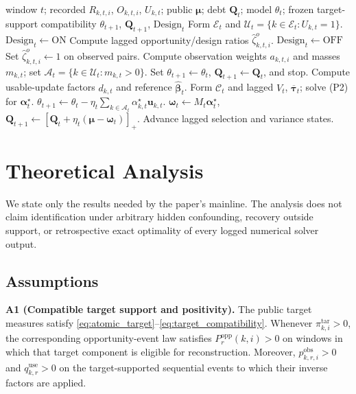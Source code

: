 \documentclass[letterpaper,journal]{IEEEtran}
\begin{document}
\begin{algorithm}[t]
\caption{Window-close RAVEN-MCS aggregation with support-conditional Design}
\label{alg:window_close}
\begin{algorithmic}[1]
\REQUIRE window $t$; recorded $R_{k,t,i}$, $O_{k,t,i}$, $U_{k,t}$;
public $\boldsymbol\mu$; debt $\mathbf{Q}_t$; model $\theta_t$;
frozen target-support compatibility
\ENSURE $\theta_{t+1}$, $\mathbf{Q}_{t+1}$, $\mathrm{Design}_t$
\STATE Form $\mathcal{E}_t$ and
$\mathcal{U}_t=\{k\in\mathcal{E}_t:U_{k,t}=1\}$.
\STATE $\mathrm{Design}_t\leftarrow\mathrm{ON}$
\STATE Compute lagged opportunity/design ratios
$\widehat\zeta^{o}_{k,t,i}$.
\ELSE
\STATE $\mathrm{Design}_t\leftarrow\mathrm{OFF}$
\STATE Set $\widehat\zeta^{o}_{k,t,i}\leftarrow 1$ on observed pairs.
\ENDIF
\STATE Compute observation weights $a_{k,t,i}$ and masses $m_{k,t}$;
set $\mathcal{A}_t=\{k\in\mathcal{U}_t:m_{k,t}>0\}$.
\STATE Set $\theta_{t+1}\leftarrow\theta_t$,
$\mathbf{Q}_{t+1}\leftarrow\mathbf{Q}_t$, and stop.
\ELSE
\STATE Compute usable-update factors $d_{k,t}$ and reference
$\widehat{\boldsymbol\beta}_t$.
\STATE Form $\mathcal{C}_t$ and lagged $V_t$,
$\overline{\boldsymbol\tau}_t$; solve (P2) for
$\boldsymbol\alpha_t^\star$.
\STATE $\theta_{t+1}\leftarrow\theta_t
-\eta_t\sum_{k\in\mathcal{A}_t}\alpha^\star_{k,t}\mathbf{u}_{k,t}$.
\STATE $\boldsymbol\omega_t\leftarrow M_t\boldsymbol\alpha_t^\star$,
$\mathbf{Q}_{t+1}\leftarrow
[\mathbf{Q}_t+\eta_t(\boldsymbol\mu-\boldsymbol\omega_t)]_+$.
\STATE Advance lagged selection and variance states.
\ENDIF
\end{algorithmic}
\end{algorithm}


\section{Theoretical Analysis}
\label{sec:theory}

We state only the results needed by the paper's mainline.  The analysis does not
claim identification under arbitrary hidden confounding, recovery outside
support, or retrospective exact optimality of every logged numerical solver
output.

\subsection{Assumptions}
\label{subsec:assumptions}

\noindent\textbf{A1 (Compatible target support and positivity).}
The public target measures satisfy
\eqref{eq:atomic_target}--\eqref{eq:target_compatibility}.  Whenever
$\pi^{\mathrm{tar}}_{k,i}>0$, the corresponding opportunity-event law satisfies
$P_r^{\mathrm{opp}}(k,i)>0$ on windows in which that target component is
eligible for reconstruction.  Moreover,
$p^{\mathrm{obs}}_{k,r,i}>0$ and $q^{\mathrm{use}}_{k,r}>0$ on the
target-supported sequential events to which their inverse factors are applied.
\end{document}
